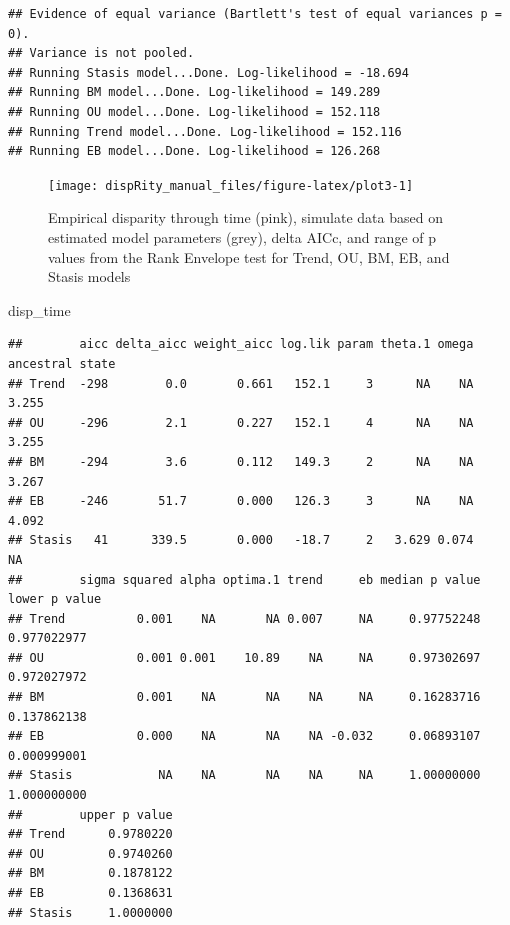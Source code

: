 \documentclass[
]{book}
\newenvironment{Shaded}{\begin{snugshade}}{\end{snugshade}}
\newcommand{\NormalTok}[1]{#1}
\begin{document}
\begin{verbatim}
## Evidence of equal variance (Bartlett's test of equal variances p = 0).
## Variance is not pooled.
## Running Stasis model...Done. Log-likelihood = -18.694
## Running BM model...Done. Log-likelihood = 149.289
## Running OU model...Done. Log-likelihood = 152.118
## Running Trend model...Done. Log-likelihood = 152.116
## Running EB model...Done. Log-likelihood = 126.268
\end{verbatim}

\begin{figure}

{\centering \texttt{[image: dispRity\_manual\_files/figure-latex/plot3-1]} 

}

\caption{Empirical disparity through time (pink), simulate data based on estimated model parameters (grey), delta AICc, and range of p values from the Rank Envelope test for Trend, OU, BM, EB, and Stasis models}\label{fig:plot3}
\end{figure}

\begin{Shaded}
\begin{Highlighting}[]
\NormalTok{disp\_time}
\end{Highlighting}
\end{Shaded}

\begin{verbatim}
##        aicc delta_aicc weight_aicc log.lik param theta.1 omega ancestral state
## Trend  -298        0.0       0.661   152.1     3      NA    NA           3.255
## OU     -296        2.1       0.227   152.1     4      NA    NA           3.255
## BM     -294        3.6       0.112   149.3     2      NA    NA           3.267
## EB     -246       51.7       0.000   126.3     3      NA    NA           4.092
## Stasis   41      339.5       0.000   -18.7     2   3.629 0.074              NA
##        sigma squared alpha optima.1 trend     eb median p value lower p value
## Trend          0.001    NA       NA 0.007     NA     0.97752248   0.977022977
## OU             0.001 0.001    10.89    NA     NA     0.97302697   0.972027972
## BM             0.001    NA       NA    NA     NA     0.16283716   0.137862138
## EB             0.000    NA       NA    NA -0.032     0.06893107   0.000999001
## Stasis            NA    NA       NA    NA     NA     1.00000000   1.000000000
##        upper p value
## Trend      0.9780220
## OU         0.9740260
## BM         0.1878122
## EB         0.1368631
## Stasis     1.0000000
\end{verbatim}
\end{document}
